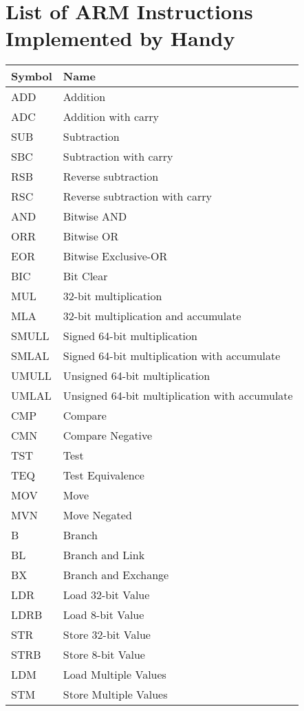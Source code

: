 
\chapter{List of ARM Instructions Implemented by Handy} %

\label{ch:listinstructions} %


\begin{tabularx}{\textwidth}{l|X}
  Symbol & Name \\ \hline
  ADD & Addition \\
  ADC & Addition with carry \\
  SUB & Subtraction \\
  SBC & Subtraction with carry \\
  RSB & Reverse subtraction \\
  RSC & Reverse subtraction with carry \\
  AND & Bitwise AND \\
  ORR & Bitwise OR \\
  EOR & Bitwise Exclusive-OR \\
  BIC & Bit Clear \\
  MUL & 32-bit multiplication \\
  MLA & 32-bit multiplication and accumulate \\
  SMULL & Signed 64-bit multiplication \\
  SMLAL & Signed 64-bit multiplication with accumulate \\
  UMULL & Unsigned 64-bit multiplication \\
  UMLAL & Unsigned 64-bit multiplication with accumulate \\
  CMP & Compare \\
  CMN & Compare Negative \\
  TST & Test \\
  TEQ & Test Equivalence \\
  MOV & Move \\
  MVN & Move Negated \\
  B & Branch \\
  BL & Branch and Link \\
  BX & Branch and Exchange \\
  LDR & Load 32-bit Value \\
  LDRB & Load 8-bit Value \\
  STR & Store 32-bit Value \\
  STRB & Store 8-bit Value \\
  LDM & Load Multiple Values \\
  STM & Store Multiple Values
\end{tabularx}
